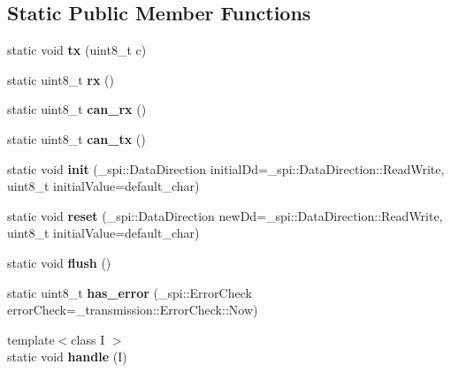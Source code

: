 \subsection*{Static Public Member Functions}
\begin{DoxyCompactItemize}
\item 
\hypertarget{classSpiSlave_a7a93c5ee67495e9e2ab89dc36e70363b}{}\label{classSpiSlave_a7a93c5ee67495e9e2ab89dc36e70363b} 
static void {\bfseries tx} (uint8\+\_\+t c)
\item 
\hypertarget{classSpiSlave_a002a0eaf01ab45db97fa956f537c6264}{}\label{classSpiSlave_a002a0eaf01ab45db97fa956f537c6264} 
static uint8\+\_\+t {\bfseries rx} ()
\item 
\hypertarget{classSpiSlave_afd0d1035ca45ac012a54c3ff42e94985}{}\label{classSpiSlave_afd0d1035ca45ac012a54c3ff42e94985} 
static uint8\+\_\+t {\bfseries can\+\_\+rx} ()
\item 
\hypertarget{classSpiSlave_ae7c8db95f89ae369fd14601083dcf393}{}\label{classSpiSlave_ae7c8db95f89ae369fd14601083dcf393} 
static uint8\+\_\+t {\bfseries can\+\_\+tx} ()
\item 
\hypertarget{classSpiSlave_af970f2b3c7b0aa2e0c47d4848c39d2a7}{}\label{classSpiSlave_af970f2b3c7b0aa2e0c47d4848c39d2a7} 
static void {\bfseries init} (\+\_\+spi\+::\+Data\+Direction initial\+Dd=\+\_\+spi\+::\+Data\+Direction\+::\+Read\+Write, uint8\+\_\+t initial\+Value=default\+\_\+char)
\item 
\hypertarget{classSpiSlave_afa098a4ceeea041e478156d11774fa6e}{}\label{classSpiSlave_afa098a4ceeea041e478156d11774fa6e} 
static void {\bfseries reset} (\+\_\+spi\+::\+Data\+Direction new\+Dd=\+\_\+spi\+::\+Data\+Direction\+::\+Read\+Write, uint8\+\_\+t initial\+Value=default\+\_\+char)
\item 
\hypertarget{classSpiSlave_ae9aca59b22d840e5c0e9139efdd1e43d}{}\label{classSpiSlave_ae9aca59b22d840e5c0e9139efdd1e43d} 
static void {\bfseries flush} ()
\item 
\hypertarget{classSpiSlave_a7598120960f7a9b117bae0a7efadd521}{}\label{classSpiSlave_a7598120960f7a9b117bae0a7efadd521} 
static uint8\+\_\+t {\bfseries has\+\_\+error} (\+\_\+spi\+::\+Error\+Check error\+Check=\+\_\+transmission\+::\+Error\+Check\+::\+Now)
\item 
\hypertarget{classSpiSlave_a6368b7175f34d500adfda15ea769d27d}{}\label{classSpiSlave_a6368b7175f34d500adfda15ea769d27d} 
{\footnotesize template$<$class I $>$ }\\static void {\bfseries handle} (I)
\item 

\end{DoxyCompactItemize}
